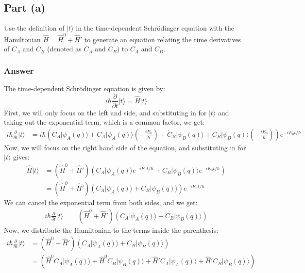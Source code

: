 \documentclass{article}
\begin{document}
\subsection{Part (a)}
Use the definition of \( \lvert t \rangle \) in the time-dependent Schrödinger equation with the Hamiltonian \( \hat{H} = \hat{H}^0 + \hat{H}' \) to generate an equation relating the time derivatives of \( C_A \) and \( C_B \) (denoted as \( \dot{C}_A \) and \( \dot{C}_B \)) to \( C_A \) and \( C_B \).

\subsubsection{Answer}
The time-dependent Schrödinger equation is given by:
\begin{equation}
    i\hbar \frac{\partial}{\partial t} \lvert t \rangle = \hat{H} \lvert t \rangle
\end{equation}
First, we will only focus on the left and side, and substituting in for \( \lvert t \rangle \) and taking out the exponential term, which is a common factor, we get:
\begin{align}
i\hbar \frac{\partial}{\partial t} \lvert t \rangle &= i\hbar \left( \dot{C}_A \lvert \psi_A(q) \rangle + C_A \lvert \psi_A(q) \rangle \left( -\frac{iE_0}{\hbar} \right) + \dot{C}_B \lvert \psi_B(q) \rangle + C_B \lvert \psi_B(q) \rangle \left( -\frac{iE_0}{\hbar} \right) \right) e^{-iE_0t/\hbar}
\end{align}
Now, we will focus on the right hand side of the equation, and substituting in for \( \lvert t \rangle \) gives:
\begin{align}
\hat{H} \lvert t \rangle &= \left( \hat{H}^0 + \hat{H}' \right) \left( C_A \lvert \psi_A(q) \rangle e^{-iE_0t/\hbar} + C_B \lvert \psi_B(q) \rangle e^{-iE_0t/\hbar} \right) \\
&= \left( \hat{H}^0 + \hat{H}' \right) \left( C_A \lvert \psi_A(q) \rangle + C_B \lvert \psi_B(q) \rangle \right) e^{-iE_0t/\hbar}
\end{align}
We can cancel the exponential term from both sides, and we get:
\begin{align}
i\hbar \frac{\partial}{\partial t} \lvert t \rangle &= \left( \hat{H}^0 + \hat{H}' \right) \left( C_A \lvert \psi_A(q) \rangle + C_B \lvert \psi_B(q) \rangle \right)
\end{align}
Now, we distribute the Hamiltonian to the terms inside the parenthesis:
\begin{align}
i\hbar \frac{\partial}{\partial t} \lvert t \rangle &= \left( \hat{H}^0 + \hat{H}' \right) \left( C_A \lvert \psi_A(q) \rangle + C_B \lvert \psi_B(q) \rangle \right) \\
&= \left( \hat{H}^0 C_A \lvert \psi_A(q) \rangle + \hat{H}^0 C_B \lvert \psi_B(q) \rangle + \hat{H}' C_A \lvert \psi_A(q) \rangle + \hat{H}' C_B \lvert \psi_B(q) \rangle \right)
\end{align}
\end{document}

